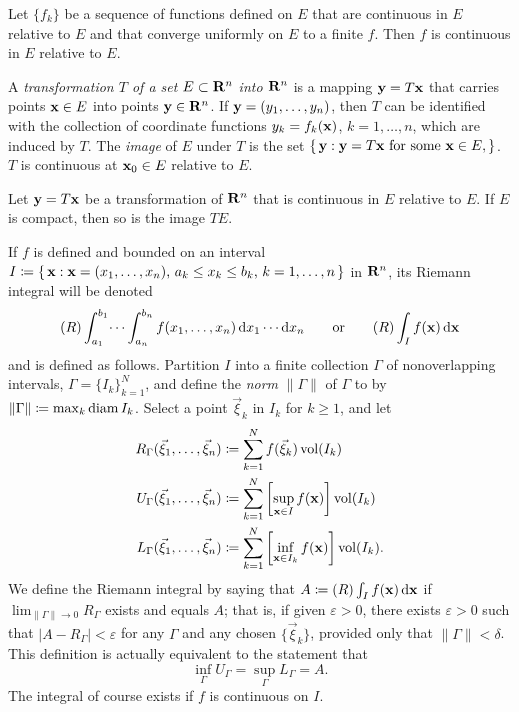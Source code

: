 \begin{theorem}[1.16]
Let $\{f_k\}$ be a sequence of functions defined on $E$ that are continuous
in $E$ relative to $E$ and that converge uniformly on $E$ to a finite
$f$. Then $f$ is continuous in $E$ relative to $E$.
\end{theorem}

A \emph{transformation $T$ of a set $E\subset\mathbf{R}^n$ into $\mathbf{R}^n$} is a
mapping $\mathbf{y}=T\mathbf{x}$ that carries points $\mathbf{x}\in E$ into points
$\mathbf{y}\in\mathbf{R}^n$. If $\mathbf{y}=(y_1,\dotsc,y_n)$, then $T$ can be identified
with the collection of coordinate functions $y_k=f_k(\mathbf{x})$,
$k=1,\dotsc,n$, which are induced by $T$. The \emph{image} of $E$ under $T$
is the set $\left\{\,\mathbf{y}:\text{$\mathbf{y}=T\mathbf{x}$ for some $\mathbf{x}\in
    E$},\right\}$. $T$ is continuous at $\mathbf{x}_0\in E$ relative to $E$.

\begin{theorem}[1.17]
Let $\mathbf{y}=T\mathbf{x}$ be a transformation of $\mathbf{R}^n$ that is continuous in $E$
relative to $E$. If $E$ is compact, then so is the image $TE$.
\end{theorem}

If $f$ is defined and bounded on an interval
$I\coloneqq\left\{\,\mathbf{x}:\text{$\mathbf{x}=(x_1,\dotsc,x_n)$, $a_k\leq x_k\leq
    b_k$, $k=1,\dotsc,n$}\,\right\}$ in $\mathbf{R}^n$, its Riemann integral will
be denoted
\begin{equation}
  \label{eq:riemann-integral}
(R)\int_{a_1}^{b_1}\dotsi\int_{a_n}^{b_n}f(x_1,\dotsc,x_n)\mathop{}\!\mathrm{d}
x_1\dotsm\mathop{}\!\mathrm{d} x_n
\qquad\text{or}\qquad
(R)\int_I f(\mathbf{x})\mathop{}\!\mathrm{d}\mathbf{x}
\end{equation}
and is defined as follows. Partition $I$ into a finite collection $\Gamma$
of nonoverlapping intervals, $\Gamma={\{I_k\}}_{k=1}^N$, and define the
\emph{norm} $\|\Gamma\|$ of $\Gamma$ to by $\|\Gamma\|\coloneqq\max_k \operatorname{diam}
I_k$. Select a point $\vec\xi_k$ in $I_k$ for $k\geq 1$, and let
\begin{equation}
\label{eq:riemannian-integral-partitions}
\begin{aligned}
R_\Gamma(\vec\xi_1,\dotsc,\vec\xi_n)&\coloneqq\sum_{k=1}^N f(\vec\xi_k)\operatorname{vol}(I_k)\\
U_\Gamma(\vec\xi_1,\dotsc,\vec\xi_n)&\coloneqq\sum_{k=1}^N\left[\sup_{\mathbf{x}\in I}
  f(\mathbf{x})\right]\operatorname{vol}(I_k)\\
L_\Gamma(\vec\xi_1,\dotsc,\vec\xi_n)&\coloneqq\sum_{k=1}^N\left[\inf_{\mathbf{x}\in
    I_k}f(\mathbf{x})\right]\operatorname{vol}(I_k).
\end{aligned}
\end{equation}
We define the Riemann integral by saying that $A\coloneqq (R)\int_I
f(\mathbf{x})\mathop{}\!\mathrm{d}\mathbf{x}$ if $\lim_{\|\Gamma\|\to 0}R_\Gamma$ exists and equals
$A$; that is, if given $\varepsilon>0$, there exists $\varepsilon>0$ such
that $|A-R_\Gamma|<\varepsilon$ for any $\Gamma$ and any chosen
$\{\vec\xi_k\}$, provided only that $\|\Gamma\|<\delta$. This definition is
actually equivalent to the statement that
\begin{equation}
  \label{eq:upper-lower-rieemann-sums}
\inf_\Gamma U_\Gamma=\sup_\Gamma L_\Gamma=A.
\end{equation}
The integral of course exists if $f$ is continuous on $I$.


